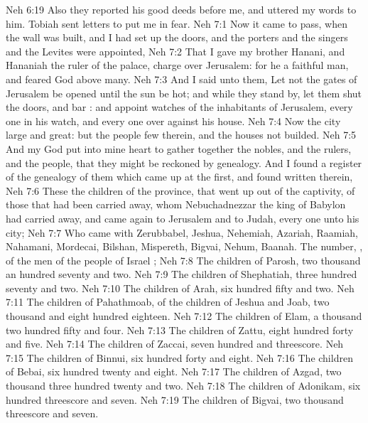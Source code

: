 \vs Neh 6:19 Also they reported his good deeds before me, and uttered my words to him.  Tobiah sent letters to put me in fear.
\vs Neh 7:1 Now it came to pass, when the wall was built, and I had set up the doors, and the porters and the singers and the Levites were appointed,
\vs Neh 7:2 That I gave my brother Hanani, and Hananiah the ruler of the palace, charge over Jerusalem: for he  a faithful man, and feared God above many.
\vs Neh 7:3 And I said unto them, Let not the gates of Jerusalem be opened until the sun be hot; and while they stand by, let them shut the doors, and bar : and appoint watches of the inhabitants of Jerusalem, every one in his watch, and every one  over against his house.
\vs Neh 7:4 Now the city  large and great: but the people  few therein, and the houses  not builded.
\vs Neh 7:5 And my God put into mine heart to gather together the nobles, and the rulers, and the people, that they might be reckoned by genealogy. And I found a register of the genealogy of them which came up at the first, and found written therein,
\vs Neh 7:6 These  the children of the province, that went up out of the captivity, of those that had been carried away, whom Nebuchadnezzar the king of Babylon had carried away, and came again to Jerusalem and to Judah, every one unto his city;
\vs Neh 7:7 Who came with Zerubbabel, Jeshua, Nehemiah, Azariah, Raamiah, Nahamani, Mordecai, Bilshan, Mispereth, Bigvai, Nehum, Baanah. The number, , of the men of the people of Israel ;
\vs Neh 7:8 The children of Parosh, two thousand an hundred seventy and two.
\vs Neh 7:9 The children of Shephatiah, three hundred seventy and two.
\vs Neh 7:10 The children of Arah, six hundred fifty and two.
\vs Neh 7:11 The children of Pahathmoab, of the children of Jeshua and Joab, two thousand and eight hundred  eighteen.
\vs Neh 7:12 The children of Elam, a thousand two hundred fifty and four.
\vs Neh 7:13 The children of Zattu, eight hundred forty and five.
\vs Neh 7:14 The children of Zaccai, seven hundred and threescore.
\vs Neh 7:15 The children of Binnui, six hundred forty and eight.
\vs Neh 7:16 The children of Bebai, six hundred twenty and eight.
\vs Neh 7:17 The children of Azgad, two thousand three hundred twenty and two.
\vs Neh 7:18 The children of Adonikam, six hundred threescore and seven.
\vs Neh 7:19 The children of Bigvai, two thousand threescore and seven.
